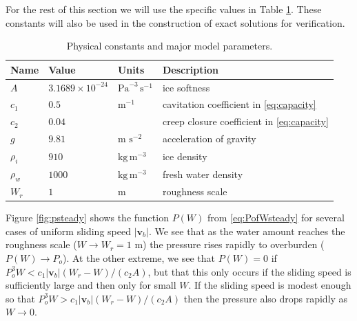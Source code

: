\documentclass[11pt,final]{amsart}%
\newcommand\bv{\mathbf{v}}
\begin{document}
For the rest of this section we will use the specific values in Table \ref{tab:constants}.  These constants will also be used in the construction of exact solutions for verification.

\begin{table}[ht]
  \centering
  \caption{Physical constants and major model parameters.}
  \begin{tabular}{lllp{3.0in}} 
    \textbf{Name} & \textbf{Value} & \textbf{Units} & \textbf{Description}\\
\hline
    $A$ & $3.1689\times 10^{-24}$ & $\text{Pa}^{-3}\,\text{s}^{-1}$ & ice softness \citep{EISMINT96} \\
    $c_1$ & $0.5$ & $\text{m}^{-1}$ & cavitation coefficient in \eqref{eq:capacity} \\
    $c_2$ & $0.04$ & & creep closure coefficient in \eqref{eq:capacity} \\
    $g$ & $9.81$ & m $\text{s}^{-2}$ & acceleration of gravity \\
    $\rho_i$ & $910$ & $\text{kg}\,\text{m}^{-3}$ & ice density \citep{GreveBlatter2009} \\
    $\rho_w$ & $1000$ & $\text{kg}\,\text{m}^{-3}$ & fresh water density \citep{GreveBlatter2009} \\
    $W_r$ & $1$ & $\text{m}$ & roughness scale \\
    \hline
  \end{tabular}
 \label{tab:constants}
\end{table}

Figure \ref{fig:psteady} shows the function $P(W)$ from \eqref{eq:PofWsteady} for several cases of uniform sliding speed $|\bv_b|$.  We see that as the water amount reaches the roughness scale ($W\to W_r=1$ m) the pressure rises rapidly to overburden ($P(W) \to P_o$).  At the other extreme, we see that $P(W)=0$ if $P_o^3 W < c_1 |\bv_b| (W_r - W) / (c_2 A)$, but that this only occurs if the sliding speed is sufficiently large and then only for small $W$.  If the sliding speed is modest enough so that $P_o^3 W > c_1 |\bv_b| (W_r - W) / (c_2 A)$ then the pressure also drops rapidly as $W\to 0$.
\end{document}
